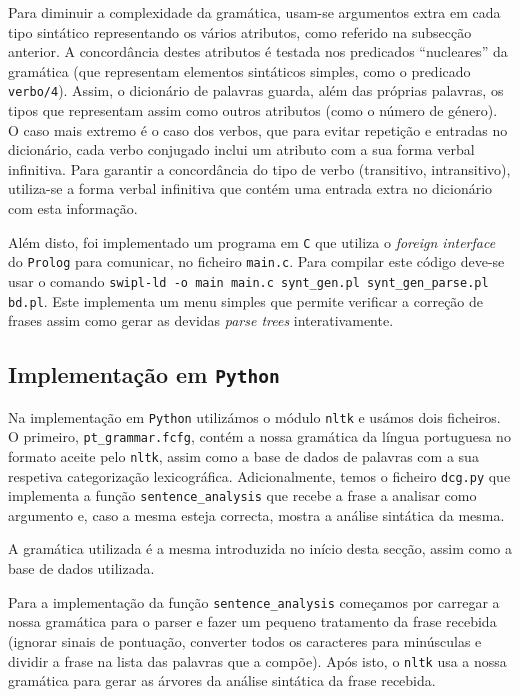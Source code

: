 \documentclass[12pt,a4paper,oneside]{article}
\begin{document}
Para diminuir a complexidade da gramática, usam-se argumentos extra em
cada tipo sintático representando os vários atributos, como referido
na subsecção anterior. A concordância destes atributos é testada nos
predicados ``nucleares'' da gramática (que representam elementos
sintáticos simples, como o predicado \texttt{verbo/4}). Assim, o
dicionário de palavras guarda, além das próprias palavras, os tipos
que representam assim como outros atributos (como o número de
género). O caso mais extremo é o caso dos verbos, que para evitar
repetição e entradas no dicionário, cada verbo conjugado inclui um
atributo com a sua forma verbal infinitiva. Para garantir a
concordância do tipo de verbo (transitivo, intransitivo), utiliza-se a
forma verbal infinitiva que contém uma entrada extra no dicionário com
esta informação.

Além disto, foi implementado um programa em \texttt{C} que utiliza o
\textit{foreign interface} do \texttt{Prolog} para comunicar, no
ficheiro \texttt{main.c}. Para compilar este código deve-se usar o
comando \texttt{swipl-ld -o main main.c synt\_gen.pl
  synt\_gen\_parse.pl bd.pl}. Este implementa um menu simples que
permite verificar a correção de frases assim como gerar as devidas
\textit{parse trees} interativamente.

\subsection{Implementação em \texttt{Python}}

Na implementação em \texttt{Python} utilizámos o módulo \texttt{nltk}
\cite{nltk:2015} e usámos dois ficheiros. O primeiro,
\texttt{pt\_grammar.fcfg}, contém a nossa gramática da língua
portuguesa no formato aceite pelo \texttt{nltk}, assim como a base de
dados de palavras com a sua respetiva categorização
lexicográfica. Adicionalmente, temos o ficheiro \texttt{dcg.py} que
implementa a função \texttt{sentence\_analysis} que recebe a frase a
analisar como argumento e, caso a mesma esteja correcta, mostra a
análise sintática da mesma.

A gramática utilizada é a mesma introduzida no início desta
secção, assim como a base de dados utilizada.

Para a implementação da função \texttt{sentence\_analysis} começamos
por carregar a nossa gramática para o parser e fazer um pequeno
tratamento da frase recebida (ignorar sinais de pontuação, converter
todos os caracteres para minúsculas e dividir a frase na lista das
palavras que a compõe). Após isto, o \texttt{nltk} usa a nossa
gramática para gerar as árvores da análise sintática da frase
recebida.
\end{document}

